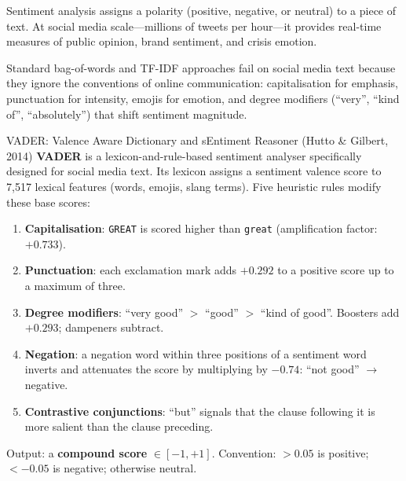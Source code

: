 Sentiment analysis assigns a polarity (positive, negative, or neutral)
to a piece of text. At social media scale---millions of tweets per
hour---it provides real-time measures of public opinion, brand sentiment,
and crisis emotion.

Standard bag-of-words and TF-IDF approaches fail on social media text
because they ignore the conventions of online communication:
capitalisation for emphasis, punctuation for intensity, emojis for
emotion, and degree modifiers (``very'', ``kind of'', ``absolutely'')
that shift sentiment magnitude.

\begin{defbox}{VADER: Valence Aware Dictionary and sEntiment Reasoner
  (Hutto \& Gilbert, 2014)}
\textbf{VADER} is a lexicon-and-rule-based sentiment analyser specifically
designed for social media text. Its lexicon assigns a sentiment valence
score to 7{,}517 lexical features (words, emojis, slang terms).
Five heuristic rules modify these base scores:
\begin{enumerate}
  \item \textbf{Capitalisation}: \texttt{GREAT} is scored higher than
        \texttt{great} (amplification factor: $+0.733$).
  \item \textbf{Punctuation}: each exclamation mark adds $+0.292$ to
        a positive score up to a maximum of three.
  \item \textbf{Degree modifiers}: ``very good'' $>$ ``good'' $>$
        ``kind of good''. Boosters add $+0.293$; dampeners subtract.
  \item \textbf{Negation}: a negation word within three positions
        of a sentiment word inverts and attenuates the score by
        multiplying by $-0.74$: ``not good'' $\to$ negative.
  \item \textbf{Contrastive conjunctions}: ``but'' signals that the
        clause following it is more salient than the clause preceding.
\end{enumerate}
Output: a \textbf{compound score} $\in [-1, +1]$. Convention:
$> 0.05$ is positive; $< -0.05$ is negative; otherwise neutral.
\end{defbox}

